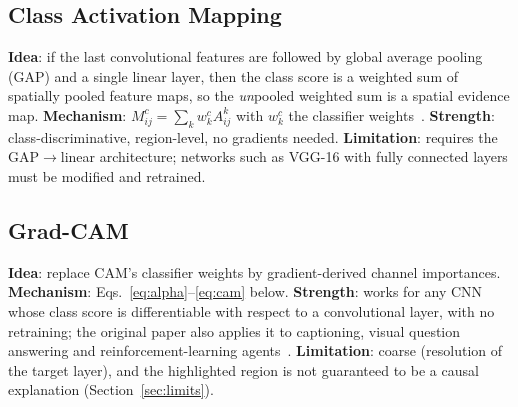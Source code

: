 \documentclass[11pt,a4paper]{article}
\newcommand{\GC}{Grad-CAM}
\begin{document}
\subsection{Class Activation Mapping}
\textbf{Idea}: if the last convolutional features are followed by global average pooling (GAP) and a single linear layer, then the class score is a weighted sum of spatially pooled feature maps, so the \emph{un}pooled weighted sum is a spatial evidence map. \textbf{Mechanism}: $M^c_{ij}=\sum_k w^c_k A^k_{ij}$ with $w^c_k$ the classifier weights~\citep{zhou2016}. \textbf{Strength}: class-discriminative, region-level, no gradients needed. \textbf{Limitation}: requires the GAP$\rightarrow$linear architecture; networks such as VGG-16 with fully connected layers must be modified and retrained.

\subsection{\GC{}}
\textbf{Idea}: replace CAM's classifier weights by gradient-derived channel importances. \textbf{Mechanism}: Eqs.~\eqref{eq:alpha}--\eqref{eq:cam} below. \textbf{Strength}: works for any CNN whose class score is differentiable with respect to a convolutional layer, with no retraining; the original paper also applies it to captioning, visual question answering and reinforcement-learning agents~\citep{selvaraju2017}. \textbf{Limitation}: coarse (resolution of the target layer), and the highlighted region is not guaranteed to be a causal explanation (Section~\ref{sec:limits}).
\end{document}
